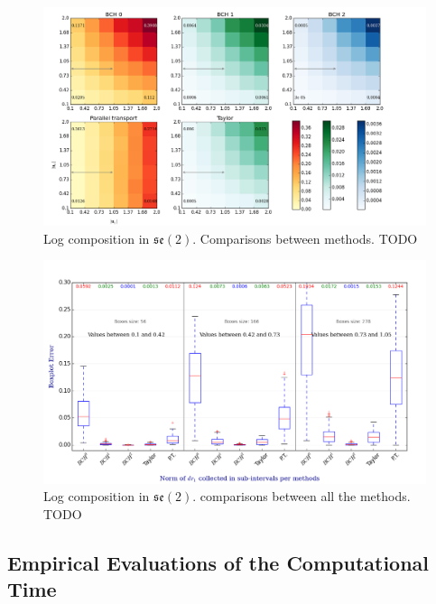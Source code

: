 \begin{figure}[!ht]
	\hspace{-2.5cm}
	\includegraphics[scale=0.58]{figures/se2_image_scale.png}
	\caption{Log composition in $\mathfrak{se}(2)$. Comparisons between methods. TODO}
	\label{fig:se2_image_scale}
\end{figure}

\begin{figure}[!ht]
	\hspace{-2.4cm}
	\includegraphics[scale=0.61]{figures/se2_boxplot.png}
	\caption{Log composition in $\mathfrak{se}(2)$. comparisons between all the methods. TODO}
	\label{fig:se2_boxplot}
\end{figure}


\subsection{Empirical Evaluations of the Computational Time}


